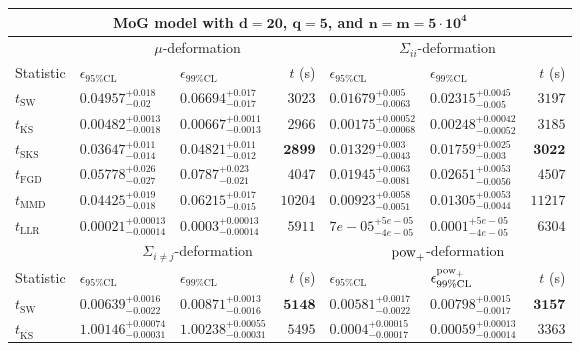 \begin{tabular}{l|llr|llr}
	\toprule
	\multicolumn{7}{c}{{\bf MoG model with $\mathbf{d=20}$, $\mathbf{q=5}$, and $\mathbf{n=m=5\cdot 10^{4}}$}} \\
	\toprule
	\multicolumn{1}{c}{} & \multicolumn{3}{c}{$\mu$-deformation} & \multicolumn{3}{c}{$\Sigma_{ii}$-deformation} \\
	Statistic & $\epsilon_{95\%\mathrm{CL}}$ & $\epsilon_{99\%\mathrm    {CL}}$ & $t$ (s) & $\epsilon_{95\%\mathrm{CL}}$ & $\epsilon_{99\%\mathrm{CL}}$ & $t$ (s) \\
	\midrule
	$t_{\mathrm{SW}}$ & $0.04957_{-0.02}^{+0.018}$ & $0.06694_{-0.017}^{+0.017}$ & $3023$ & $0.01679_{-0.0063}^{+0.005}$ & $0.02315_{-0.005}^{+0.0045}$ & $3197$ \\
	$t_{\overline{\mathrm{KS}}}$ & ${\mathbf{0.00482_{-0.0018}^{+0.0013}}}$ & ${\mathbf{0.00667_{-0.0013}^{+0.0011}}}$ & $2966$ & ${\mathbf{0.00175_{-0.00068}^{+0.00052}}}$ & ${\mathbf{0.00248_{-0.00052}^{+0.00042}}}$ & $3185$ \\
	$t_{\mathrm{SKS}}$ & $0.03647_{-0.014}^{+0.011}$ & $0.04821_{-0.012}^{+0.011}$ & ${\mathbf{2899}}$ & $0.01329_{-0.0043}^{+0.003}$ & $0.01759_{-0.003}^{+0.0025}$ & ${\mathbf{3022}}$ \\
	$t_{\mathrm{FGD}}$ & $0.05778_{-0.027}^{+0.026}$ & $0.0787_{-0.021}^{+0.023}$ & $4047$ & $0.01945_{-0.0081}^{+0.0063}$ & $0.02651_{-0.0056}^{+0.0053}$ & $4507$ \\
	$t_{\mathrm{MMD}}$ & $0.04425_{-0.018}^{+0.019}$ & $0.06215_{-0.015}^{+0.017}$ & $10204$ & $0.00923_{-0.0051}^{+0.0058}$ & $0.01305_{-0.0044}^{+0.0053}$ & $11217$ \\
	$t_{\mathrm{LLR}}$ & $0.00021_{-0.00014}^{+0.00013}$ & $0.0003_{-0.00014}^{+0.00013}$ & $5911$ & $7e-05_{-4e-05}^{+5e-05}$ & $0.0001_{-4e-05}^{+5e-05}$ & $6304$ \\
	\toprule
	\multicolumn{1}{c}{} & \multicolumn{3}{c}{$\Sigma_{i\neq j}$-deformation} & \multicolumn{3}{c}{$\rm{pow}_{+}$-deformation} \\
	Statistic & $\epsilon_{95\%\mathrm{CL}}$ & $\epsilon_{99\%\mathrm{CL}}$ & $t$ (s) & $\epsilon_{95\%\mathrm{CL}}$ & $\epsilon^{\rm   {pow}_{+}}_{99\%\mathrm{CL}}$ & $t$ (s) \\
	\midrule
	$t_{\mathrm{SW}}$ & $0.00639_{-0.0022}^{+0.0016}$ & $0.00871_{-0.0016}^{+0.0013}$ & ${\mathbf{5148}}$ & $0.00581_{-0.0022}^{+0.0017}$ & $0.00798_{-0.0017}^{+0.0015}$ & ${\mathbf{3157}}$ \\
	$t_{\overline{\mathrm{KS}}}$ & $1.00146_{-0.00031}^{+0.00074}$ & $1.00238_{-0.00031}^{+0.00055}$ & $5495$ & ${\mathbf{0.0004_{-0.00017}^{+0.00015}}}$ & ${\mathbf{0.00059_{-0.00014}^{+0.00013}}}$ & $3363$ \\

\end{tabular}
